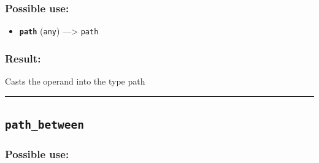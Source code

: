 \documentclass[]{book}
\providecommand{\tightlist}{%
  \setlength{\itemsep}{0pt}\setlength{\parskip}{0pt}}
\theoremstyle{definition}
\theoremstyle{definition}
\theoremstyle{definition}
\theoremstyle{remark}
\begin{document}
\subsubsection{Possible use:}\label{possible-use-394}

\begin{itemize}
\tightlist
\item
  \textbf{\texttt{path}} (\texttt{any}) ---\textgreater{} \texttt{path}
\end{itemize}

\subsubsection{Result:}\label{result-380}

Casts the operand into the type path

\begin{center}\rule{0.5\linewidth}{\linethickness}\end{center}

\subsection{\texorpdfstring{\texttt{path\_between}}{path\_between}}\label{path_between}

\subsubsection{Possible use:}\label{possible-use-395}
\end{document}

